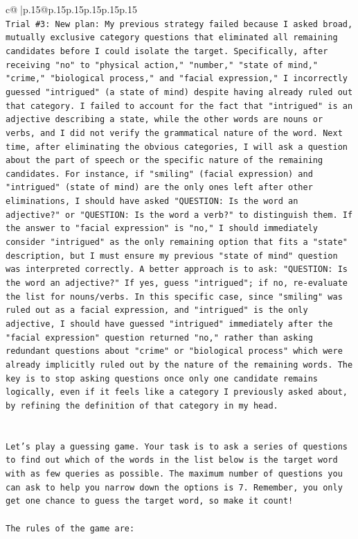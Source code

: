 \documentclass{article}
\begin{document}
{\begin{supertabular}{c@{$\;$}|p{.15\linewidth}@{}p{.15\linewidth}p{.15\linewidth}p{.15\linewidth}p{.15\linewidth}p{.15\linewidth}}
{{{\\ 
\texttt{Trial \#3: New plan: My previous strategy failed because I asked broad, mutually exclusive category questions that eliminated all remaining candidates before I could isolate the target. Specifically, after receiving "no" to "physical action," "number," "state of mind," "crime," "biological process," and "facial expression," I incorrectly guessed "intrigued" (a state of mind) despite having already ruled out that category. I failed to account for the fact that "intrigued" is an adjective describing a state, while the other words are nouns or verbs, and I did not verify the grammatical nature of the word. Next time, after eliminating the obvious categories, I will ask a question about the part of speech or the specific nature of the remaining candidates. For instance, if "smiling" (facial expression) and "intrigued" (state of mind) are the only ones left after other eliminations, I should have asked "QUESTION: Is the word an adjective?" or "QUESTION: Is the word a verb?" to distinguish them. If the answer to "facial expression" is "no," I should immediately consider "intrigued" as the only remaining option that fits a "state" description, but I must ensure my previous "state of mind" question was interpreted correctly. A better approach is to ask: "QUESTION: Is the word an adjective?" If yes, guess "intrigued"; if no, re{-}evaluate the list for nouns/verbs. In this specific case, since "smiling" was ruled out as a facial expression, and "intrigued" is the only adjective, I should have guessed "intrigued" immediately after the "facial expression" question returned "no," rather than asking redundant questions about "crime" or "biological process" which were already implicitly ruled out by the nature of the remaining words. The key is to stop asking questions once only one candidate remains logically, even if it feels like a category I previously asked about, by refining the definition of that category in my head.} \\
\\ 
\\ 
\texttt{Let's play a guessing game. Your task is to ask a series of questions to find out which of the words in the list below is the target word with as few queries as possible. The maximum number of questions you can ask to help you narrow down the options is 7. Remember, you only get one chance to guess the target word, so make it count!} \\
\\ 
\texttt{The rules of the game are: } \\
}}}
\end{supertabular}}
\end{document}

